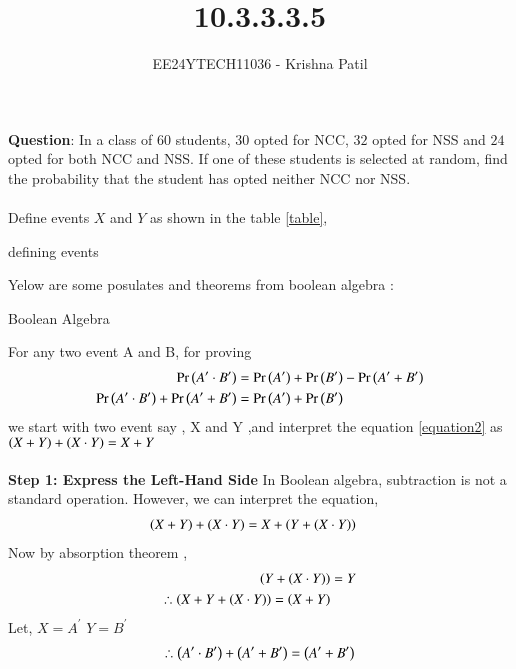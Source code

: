\documentclass[journal]{IEEEtran}
\begin{document}

\vspace{3cm}

\title{10.3.3.3.5}
\author{EE24YTECH11036 - Krishna Patil}
{\let\newpage\relax\maketitle}
\renewcommand{\thefigure}{\theenumi}
\renewcommand{\thetable}{\theenumi}
\setlength{\intextsep}{10pt} %


\textbf{Question}: In a class of $60$ students, $30$ opted for NCC, $32$ opted for NSS and $24$ opted for both NCC and NSS. If one of these students is selected at random, find the probability that the student has opted neither NCC nor NSS. \\ \\
\solution
Define events $X$ and $Y$ as shown in the table \ref{table}, \\
\begin{table}[h!]    
  \centering
  
  \caption{defining events}
  \label{table}
\end{table}
\newline Yelow are some posulates and theorems from boolean algebra :
\begin{table}[h!]    
  \centering
  
  \caption{Boolean Algebra}
  \label{table2}
\end{table}
\newline For any two event A and B,  for proving 
\begin{align}
\Pr\left(A^\prime \cdot B^\prime\right) &= \Pr\left(A^\prime\right) + \Pr\left(B^\prime\right) - \Pr\left(A^\prime + B^\prime\right) \\
\Pr\left(A^\prime \cdot B^\prime\right) + \Pr\left(A^\prime + B^\prime\right) &= \Pr\left(A^\prime\right) + \Pr\left(B^\prime\right) \label{equation2} 
\end{align}
we start with two event say , X and Y ,and interpret the equation \ref{equation2} as $\left(X + Y\right)+\left(X \cdot Y\right) = X + Y $ \\ \\
\textbf{Step 1: Express the Left-Hand Side}
In Boolean algebra, subtraction is not a standard operation. However, we can interpret the equation,
\begin{align}
\left(X + Y\right)+\left(X \cdot Y\right) &= X + \left(Y + \left(X \cdot Y\right)\right)  
\end{align}
Now by absorption theorem , 
\begin{align}
\left(Y + \left(X \cdot Y\right)\right) &= Y \\
\therefore \left(X +  Y + \left(X \cdot Y\right)\right) = \left(X + Y\right)  
\end{align}
Let, $X = A^\prime$ $Y = B^\prime $
\begin{align}
    \therefore  \left(A^\prime \cdot B^\prime\right) + \left(A^\prime + B^\prime\right)&= \left({A^\prime} + {B^\prime}\right) \\
\end{align}
\end{document}
